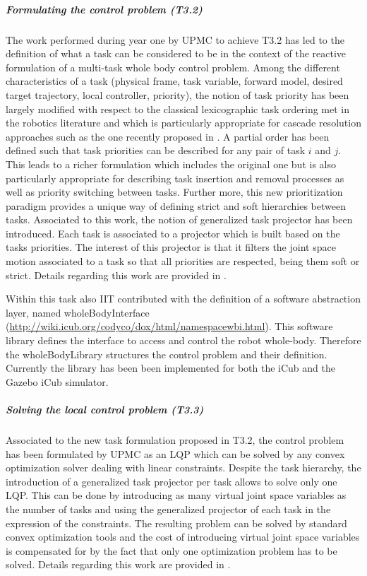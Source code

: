 \documentclass[12pt,a4paper,twoside]{article}
\begin{document}
\subparagraph{Formulating the control problem (T3.2)}

The work performed during year one by UPMC to achieve T3.2 has led to the definition of what a task can be considered to be in the context of the reactive formulation of a multi-task whole body control problem. Among the different characteristics of a task (physical frame, task variable, forward model, desired target trajectory, local controller, priority), the notion of task priority has been largely modified with respect to the classical lexicographic task ordering met in the robotics literature and which is particularly appropriate for cascade resolution approaches such as the one recently proposed in \cite{escande2012}. A partial order has been defined such that task priorities can be described for any pair of task $i$ and $j$. This leads to a richer formulation which includes the original one but is also particularly appropriate for describing task insertion and removal processes as well as priority switching between tasks. Further more, this new prioritization paradigm provides a unique way of defining strict and soft hierarchies between tasks. Associated to this work, the notion  of generalized task projector has been introduced. Each task is associated to a projector which is built based on the tasks priorities. The interest of this projector is that it filters the joint space motion associated to a task so that all priorities are respected, being them soft or strict. Details regarding this work are provided in \cite{liu2013}.

Within this task also IIT contributed with the definition of a software abstraction layer, named wholeBodyInterface (\url{http://wiki.icub.org/codyco/dox/html/namespacewbi.html}). This software library defines the interface to access and control the robot  whole-body. Therefore the wholeBodyLibrary structures the control problem and their definition. Currently the library has been been implemented for both the iCub and the Gazebo iCub simulator.  

\subparagraph{Solving the local control problem (T3.3)}

Associated to the new task formulation proposed in T3.2, the control problem has been formulated by UPMC as an LQP which can be solved by any convex optimization solver dealing with linear constraints. Despite the task hierarchy, the introduction of a generalized task projector per task allows to solve only one LQP. This can be done by introducing as many virtual joint space variables as the number of tasks and using the generalized projector of each task in the expression of the constraints. The resulting problem can be solved by standard convex optimization tools and the cost of introducing virtual joint space variables is compensated for by the fact that only one optimization problem has to be solved. Details regarding this work are provided in \cite{liu2013}.
\end{document}
